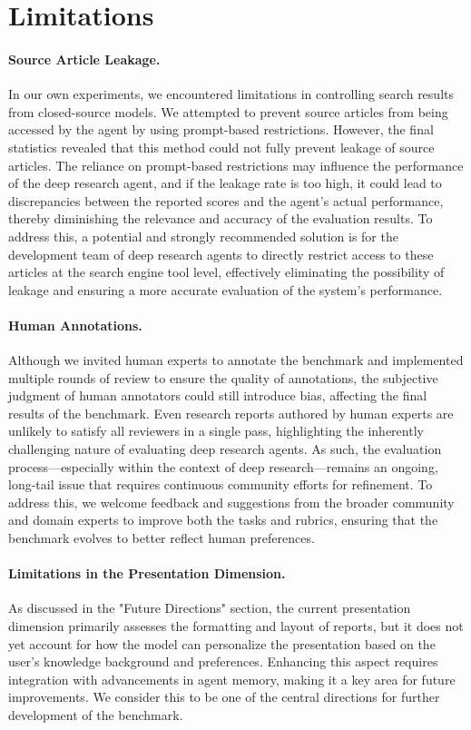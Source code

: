 \documentclass[11pt]{article}
\begin{document}
\section{Limitations}

\paragraph{Source Article Leakage.} In our own experiments, we encountered limitations in controlling search results from closed-source models. We attempted to prevent source articles from being accessed by the agent by using prompt-based restrictions. However, the final statistics revealed that this method could not fully prevent leakage of source articles. The reliance on prompt-based restrictions may influence the performance of the deep research agent, and if the leakage rate is too high, it could lead to discrepancies between the reported scores and the agent's actual performance, thereby diminishing the relevance and accuracy of the evaluation results. To address this, a potential and strongly recommended solution is for the development team of deep research agents to directly restrict access to these articles at the search engine tool level, effectively eliminating the possibility of leakage and ensuring a more accurate evaluation of the system’s performance.

\paragraph{Human Annotations.} Although we invited human experts to annotate the benchmark and implemented multiple rounds of review to ensure the quality of annotations, the subjective judgment of human annotators could still introduce bias, affecting the final results of the benchmark. Even research reports authored by human experts are unlikely to satisfy all reviewers in a single pass, highlighting the inherently challenging nature of evaluating deep research agents. As such, the evaluation process—especially within the context of deep research—remains an ongoing, long-tail issue that requires continuous community efforts for refinement. To address this, we welcome feedback and suggestions from the broader community and domain experts to improve both the tasks and rubrics, ensuring that the benchmark evolves to better reflect human preferences.

\paragraph{Limitations in the Presentation Dimension.} As discussed in the "Future Directions" section, the current presentation dimension primarily assesses the formatting and layout of reports, but it does not yet account for how the model can personalize the presentation based on the user's knowledge background and preferences. Enhancing this aspect requires integration with advancements in agent memory, making it a key area for future improvements. We consider this to be one of the central directions for further development of the benchmark.
\end{document}
